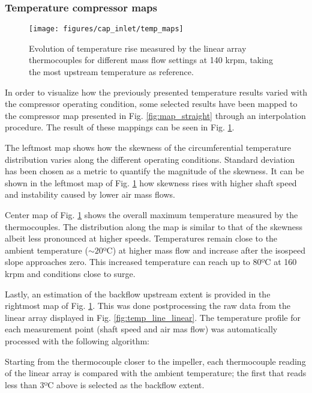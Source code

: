 \subsubsection{Temperature compressor maps}

\begin{figure}[tb!]
\centering
\texttt{[image: figures/cap\_inlet/temp\_maps]}
\caption{Evolution of temperature rise measured by the linear array thermocouples for different mass flow settings at 140 krpm, taking the most upstream temperature as reference.}
\label{fig:temp_maps}
\end{figure}

In order to visualize how the previously presented temperature results varied with the compressor operating condition, some selected results have been mapped to the compressor map presented in Fig. \ref{fig:map_straight} through an interpolation procedure. The result of these mappings can be seen in Fig. \ref{fig:temp_maps}.

The leftmost map shows how the skewness of the circumferential temperature distribution varies along the different operating conditions. Standard deviation has been chosen as a metric to quantify the magnitude of the skewness. It can be shown in the leftmost map of Fig. \ref{fig:temp_maps} how skewness rises with higher shaft speed and instability caused by lower air mass flows.

Center map of Fig. \ref{fig:temp_maps} shows the overall maximum temperature measured by the thermocouples. The distribution along the map is similar to that of the skewness albeit less pronounced at higher speeds. Temperatures remain close to the ambient temperature ($\sim 20$ºC) at higher mass flow and increase after the isospeed slope approaches zero. This increased temperature can reach up to 80ºC at 160 krpm and conditions close to surge.

Lastly, an estimation of the backflow upstream extent is provided in the rightmost map of Fig. \ref{fig:temp_maps}. This was done postprocessing the raw data from the linear array displayed in Fig. \ref{fig:temp_line_linear}. The temperature profile for each measurement point (shaft speed and air mas flow) was automatically processed with the following algorithm: 

Starting from the thermocouple closer to the impeller, each thermocouple reading of the linear array is compared with the ambient temperature; the first that reads less than 3ºC above is selected as the backflow extent.

